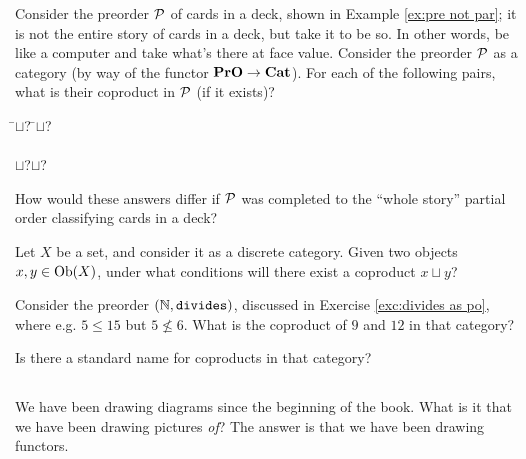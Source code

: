\begin{exercise}
Consider the preorder $\mathcal{P}$ of cards in a deck, shown in Example \ref{ex:pre not par}; it is not the entire story of cards in a deck, but take it to be so. In other words, be like a computer and take what's there at face value. Consider the preorder $\mathcal{P}$ as a category (by way of the functor ${\bf PrO}\rightarrow{\bf Cat}$). For each of the following pairs, what is their coproduct in $\mathcal{P}$ (if it exists)?
\sexc 
\begin{tabbing}
\hspace{.5in}\= $\sqcup$\;?\hspace{.5in} \=$\sqcup$\;?\\\\
\> $\sqcup$\;?\>$\sqcup$\;?
\end{tabbing}
\item How would these answers differ if $\mathcal{P}$ was completed to the “whole story” partial order classifying cards in a deck?
\endsexc
\end{exercise}

\begin{exercise}
Let $X$ be a set, and consider it as a discrete category. Given two objects $x,y\in\textnormal{Ob}(X)$, under what conditions will there exist a coproduct $x\sqcup y$?
\end{exercise}

\begin{exercise}
Consider the preorder $({\mathbb N},{\tt divides})$, discussed in Exercise \ref{exc:divides as po}, where e.g. $5\leq 15$ but $5\not\leq 6$. \sexc What is the coproduct of $9$ and $12$ in that category?
\item Is there a standard name for coproducts in that category?
\endsexc
\end{exercise}


\subsection{}\label{sec:diagrams in a category}

We have been drawing diagrams since the beginning of the book. What is it that we have been drawing pictures {\em of}? The answer is that we have been drawing functors.

